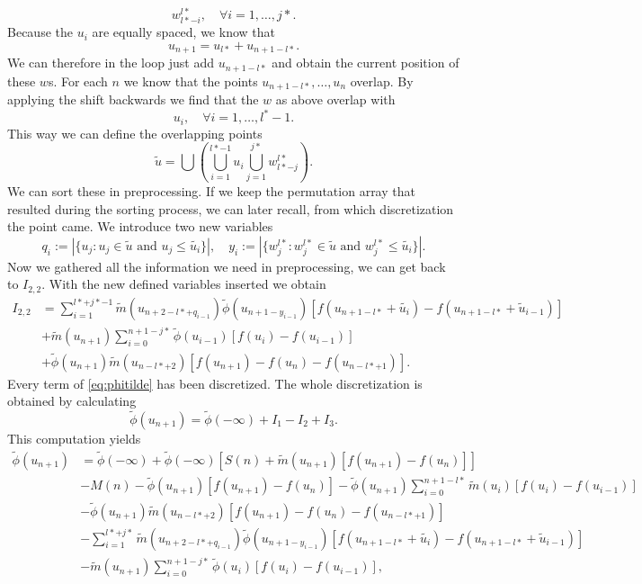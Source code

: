 \documentclass[12pt,a4paper,twoside, open=right]{scrreprt}
\theoremstyle{definition}
\theoremstyle{plain}
\newcommand{\abs}[1]{\left\vert #1\right\vert}
\begin{document}
\begin{equation}
    w^{l*}_{l*-i},\quad\forall i=1,\dotsc,j*.
\end{equation}
Because the $u_i$ are equally spaced, we know that
\begin{equation}
    u_{n+1}=u_{l*}+u_{n+1-l*}.
\end{equation}
We can therefore in the loop just add $u_{n+1-l*}$ and obtain the current position of these $w$s. For each $n$ we know that the points $u_{n+1-l*},\dotsc,u_n$ overlap. By applying the shift backwards we find that the $w$ as above overlap with 
\begin{equation}
    u_i,\quad\forall i=1,\dotsc,l^*-1.
\end{equation}
This way we can define the overlapping points 
\begin{equation}
    \tilde{u}= \bigcup\left(\bigcup_{i=1}^{l*-1}u_i\bigcup_{j=1}^{j*}w^{l*}_{l*-j}\right).
\end{equation}
We can sort these in preprocessing. If we keep the permutation array that resulted during the sorting process, we can later recall, from which discretization the point came. We introduce two new variables
\begin{equation}
    q_i:=\abs{\{u_j\colon u_j\in\tilde{u} \text{ and }u_j\le\tilde{u_i} \}},\quad
    y_i:=\abs{\{w^{l*}_j\colon w^{l*}_j\in\tilde{u} \text{ and }w^{l*}_j\le\tilde{u_i} \}}.
\end{equation}
Now we gathered all the information we need in preprocessing, we can get back to $I_{2,2}$. With the new defined variables inserted we obtain
\begin{align}
    I_{2,2}&= \sum_{i=1}^{l*+j*-1}\tilde{m}(u_{n+2-l*+q_{i-1}})\tilde{\phi}(u_{n+1-y_{i-1}})[f(u_{n+1-l*}+\tilde{u_i})-f(u_{n+1-l*}+\tilde{u}_{i-1})]\\&+\tilde{m}(u_{n+1})\sum_{i=0}^{n+1-j*}\tilde\phi(u_{i-1})[f(u_i)-f(u_{i-1})] \\&+ \tilde\phi(u_{n+1})\tilde{m}(u_{n-l*+2})[f(u_{n+1})-f(u_n)-f(u_{n-l*+1})].
\end{align}
Every term of \eqref{eq:phitilde} has been discretized. The whole discretization is obtained by calculating
\begin{equation}
    \tilde\phi(u_{n+1})=\tilde\phi(-\infty) + I_1 -I_2 +I_3.
\end{equation}
This computation yields
\begin{align}
    \tilde\phi(u_{n+1})&=\tilde\phi(-\infty) +\tilde\phi(-\infty)[S(n)+\tilde{m}(u_{n+1})[f(u_{n+1})-f(u_n)]]\label{eq:discphit1}\\&-M(n)\label{eq:discphit2} -\tilde\phi(u_{n+1})[f(u_{n+1})-f(u_{n})]  -\tilde{\phi}(u_{n+1})\sum_{i=0}^{n+1-l*}\tilde{m}(u_i)[f(u_i)-f(u_{i-1})]\\&- \tilde\phi(u_{n+1})\tilde{m}(u_{n-l*+2})[f(u_{n+1})-f(u_n)-f(u_{n-l*+1})] \\&\label{eq:discphit3}-\sum_{i=1}^{l*+j*}\tilde{m}(u_{n+2-l*+q_{i-1}})\tilde{\phi}(u_{n+1-y_{i-1}})[f(u_{n+1-l*}+\tilde{u_i})-f(u_{n+1-l*}+\tilde{u}_{i-1})]\\&\label{eq:discphit4}-\tilde{m}(u_{n+1})\sum_{i=0}^{n+1-j*}\tilde\phi(u_{i})[f(u_i)-f(u_{i-1})],
\end{align}
\end{document}
